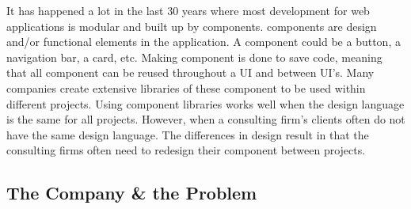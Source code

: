 It has happened a lot in the last 30 years where most development for web applications is modular and built up by \glspl{component}. \Glspl{component} are design and/or functional elements in the application. A \gls{component} could be a button, a navigation bar, a card\cite{babichSimpleDesignTips2020}, etc. Making \gls{component} is done to save code, meaning that all \gls{component} can be reused throughout a UI and between UI's. Many companies create extensive libraries of these \gls{component} to be used within different projects. Using \gls{component} libraries works well when the design language is the same for all projects. However, when a consulting firm's clients often do not have the same design language. The differences in design result in that the consulting firms often need to redesign their \gls{component} between projects. 





\subsection{The Company \& the Problem}
\label{sub:company}




